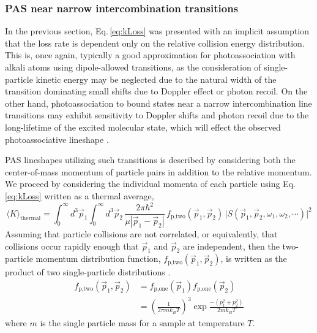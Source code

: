 \subsubsection{PAS near narrow intercombination transitions} \label{sssec:narrow_pa}
In the previous section, Eq.\,\ref{eq:kLoss} was presented with an implicit assumption that the loss rate is dependent only on the relative collision energy distribution.
This is, once again, typically a good approximation for photoassociation with alkali atoms using dipole-allowed transitions, as the consideration of single-particle kinetic energy may be neglected due to the natural width of the transition dominating small shifts due to Doppler effect or photon recoil.
On the other hand, photoassociation to bound states near a narrow intercombination line transitions may exhibit sensitivity to Doppler shifts and photon recoil due to the long-lifetime of the excited molecular state, which will effect the observed photoassociative lineshape \cite{Ciuryo2004, Borkowski2014a, Nicholson2015a, Reschovsky2018, Pachomov2017}.

PAS lineshapes utilizing such transitions is described by considering both the center-of-mass momentum of particle pairs in addition to the relative momentum.
We proceed by considering the individual momenta of each particle using Eq.\,\ref{eq:kLoss} written as a thermal average,
\begin{equation} \label{eq:onePasMom}
	 \langle K \rangle_\text{thermal} = \int_0^{\infty} d^3\vec{p}_1 \int_0^{\infty} d^3\vec{p}_2 \,\frac{2 \pi \hbar^2}{\mu |\vec{p}_1 - \vec{p}_2|} \, f_\text{p,two}( \vec{p}_1, \vec{p}_2 ) \, \vert  S(\vec{p}_1, \vec{p}_2, \omega_1, \omega_2, \cdots) \vert^2  
\end{equation}
Assuming that particle collisions are not correlated, or equivalently, that collisions occur rapidly enough that $\vec{p}_1$ and $\vec{p}_2$ are independent, then the two-particle momentum distribution function, $f_\text{p,two}( \vec{p}_1, \vec{p}_2 )$, is written as the product of two single-particle distributions \cite{Ehrenfest2015,Chliamovitch2017,Brown2008}. 
\begin{equation} \label{eq:3two_particle_prob}
\begin{split}
		 f_\text{p,two}( \vec{p}_1, \vec{p}_2 ) &= f_\text{p,one}( \vec{p}_1 ) f_\text{p,one}( \vec{p}_2 ) \\
		  &= \left(\frac{1}{2 \pi m k_B T}\right)^3 \exp{\frac{-(p_1^2 + p_2^2)}{2 m k_B T}}
\end{split}
\end{equation}
where $m$ is the single particle mass for a sample at temperature $T$.

